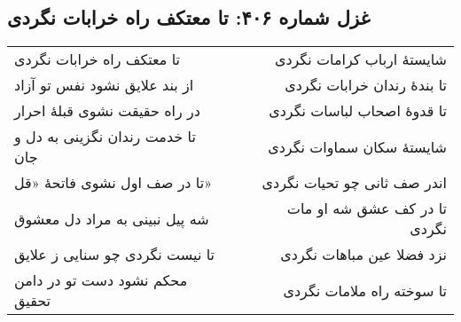 \begin{center}
\section*{غزل شماره ۴۰۶: تا معتکف راه خرابات نگردی}
\label{sec:406}
\begin{longtable}{l p{0.5cm} r}
تا معتکف راه خرابات نگردی
&&
شایستهٔ ارباب کرامات نگردی
\\
از بند علایق نشود نفس تو آزاد
&&
تا بندهٔ رندان خرابات نگردی
\\
در راه حقیقت نشوی قبلهٔ احرار
&&
تا قدوهٔ اصحاب لباسات نگردی
\\
تا خدمت رندان نگزینی به دل و جان
&&
شایستهٔ سکان سماوات نگردی
\\
تا در صف اول نشوی فاتحهٔ «قل»
&&
اندر صف ثانی چو تحیات نگردی
\\
شه پیل نبینی به مراد دل معشوق
&&
تا در کف عشق شه او مات نگردی
\\
تا نیست نگردی چو سنایی ز علایق
&&
نزد فضلا عین مباهات نگردی
\\
محکم نشود دست تو در دامن تحقیق
&&
تا سوخته راه ملامات نگردی
\\
\end{longtable}
\end{center}
